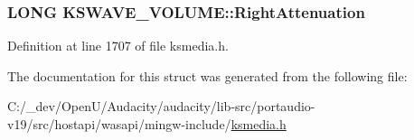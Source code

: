 \subsubsection[{\texorpdfstring{Right\+Attenuation}{RightAttenuation}}]{\setlength{\rightskip}{0pt plus 5cm}L\+O\+NG K\+S\+W\+A\+V\+E\+\_\+\+V\+O\+L\+U\+M\+E\+::\+Right\+Attenuation}\hypertarget{struct_k_s_w_a_v_e___v_o_l_u_m_e_a9131fa04b9d17df369ef05ff8930461e}{}\label{struct_k_s_w_a_v_e___v_o_l_u_m_e_a9131fa04b9d17df369ef05ff8930461e}


Definition at line 1707 of file ksmedia.\+h.



The documentation for this struct was generated from the following file\+:\begin{DoxyCompactItemize}
\item 
C\+:/\+\_\+dev/\+Open\+U/\+Audacity/audacity/lib-\/src/portaudio-\/v19/src/hostapi/wasapi/mingw-\/include/\hyperlink{ksmedia_8h}{ksmedia.\+h}\end{DoxyCompactItemize}
